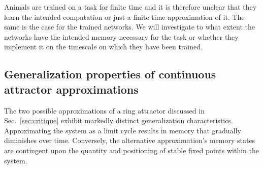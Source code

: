 \documentclass{article} %
\newcounter{ct}
\theoremstyle{definition}
\theoremstyle{remark}
\begin{document}

Animals are trained on a task for finite time and it is therefore unclear that they learn the intended computation or just a finite time approximation of it.
The same is the case for the trained networks.
We will investigate to what extent the networks have the intended memory necessary for the task or whether they implement it on the timescale on which they have been trained.

\subsection{Generalization properties of continuous attractor approximations}\label{sec:generalization}

The two possible approximations of a ring attractor discussed in Sec.~\ref{sec:critique} exhibit markedly distinct generalization characteristics.
Approximating the system as a limit cycle results in memory that gradually diminishes over time.
Conversely, the alternative approximation's memory states are contingent upon the quantity and positioning of stable fixed points within the system.








\end{document}
